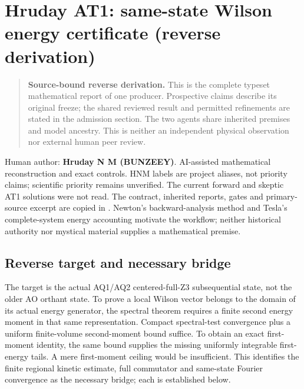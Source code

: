\hypertarget{r30-at1-reverse-hruday-same-state-wilson-energy-certificate-independent-reverse-at1}{%
\section{Hruday AT1: same-state Wilson energy certificate (reverse derivation)}\label{r30:at1:reverse:r30-at1-reverse-hruday-same-state-wilson-energy-certificate-independent-reverse-at1}}

\begin{quote}\small\textbf{Source-bound reverse derivation.} This is the complete typeset mathematical report of one producer. Prospective claims describe its original freeze; the shared reviewed result and permitted refinements are stated in the admission section. The two agents share inherited premises and model ancestry. This is neither an independent physical observation nor external human peer review.\end{quote}
Human author: \textbf{Hruday N M (BUNZEEY)}. AI-assisted mathematical reconstruction and exact controls. HNM labels are project aliases, not priority claims; scientific priority remains unverified. The current forward and skeptic AT1 solutions were not read. The contract, inherited reports, gates and primary-source excerpt are copied in {\small{}}. Newton's backward-analysis method and Tesla's complete-system energy accounting motivate the workflow; neither historical authority nor mystical material supplies a mathematical premise.

\hypertarget{r30-at1-reverse-reverse-target-and-necessary-bridge}{%
\subsection{Reverse target and necessary bridge}\label{r30:at1:reverse:r30-at1-reverse-reverse-target-and-necessary-bridge}}

The target is the actual AQ1/AQ2 centered-full-Z3 subsequential state, not the older AO orthant state. To prove a local Wilson vector belongs to the domain of its actual energy generator, the spectral theorem requires a finite second energy moment in that same representation. Compact spectral-test convergence plus a uniform finite-volume second-moment bound suffice. To obtain an exact first-moment identity, the same bound supplies the missing uniformly integrable first-energy tails. A mere first-moment ceiling would be insufficient. This identifies the finite regional kinetic estimate, full commutator and same-state Fourier convergence as the necessary bridge; each is established below.

